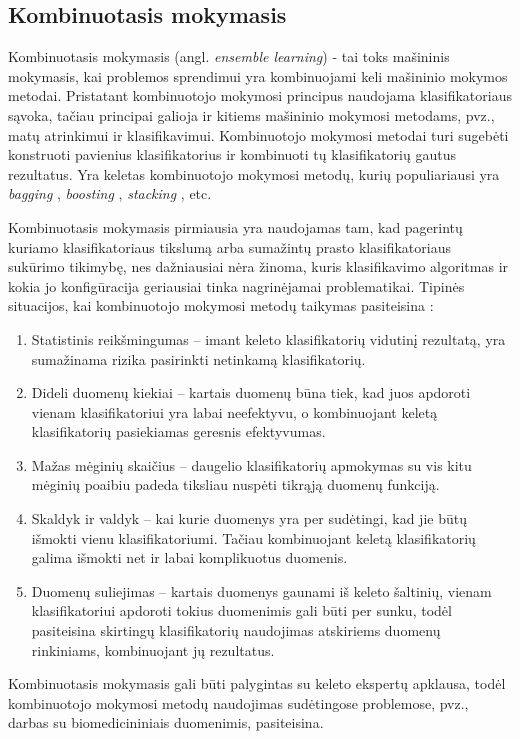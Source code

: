 

\subsection{Kombinuotasis mokymasis}

Kombinuotasis mokymasis (angl. \textit{ensemble learning}) - tai toks mašininis mokymasis, kai problemos sprendimui yra kombinuojami keli mašininio mokymos metodai. Pristatant kombinuotojo mokymosi principus naudojama klasifikatoriaus sąvoka, tačiau principai galioja ir kitiems mašininio mokymosi metodams, pvz., matų atrinkimui ir klasifikavimui. Kombinuotojo mokymosi metodai turi sugebėti konstruoti pavienius klasifikatorius ir kombinuoti tų klasifikatorių gautus rezultatus. Yra keletas kombinuotojo mokymosi metodų, kurių populiariausi yra \textit{bagging} \cite{breiman1996bagging}, \textit{boosting} \cite{schapire2003boosting}, \textit{stacking} \cite{wolpert1992stacked}, etc.

Kombinuotasis mokymasis pirmiausia yra naudojamas tam, kad pagerintų kuriamo klasifikatoriaus tikslumą arba sumažintų prasto klasifikatoriaus sukūrimo tikimybę, nes dažniausiai nėra žinoma, kuris klasifikavimo algoritmas ir kokia jo konfigūracija geriausiai tinka nagrinėjamai problematikai. Tipinės situacijos, kai kombinuotojo mokymosi metodų taikymas pasiteisina \cite{polikar2006ensemble}:
\begin{enumerate}
 \item Statistinis reikšmingumas -- imant keleto klasifikatorių vidutinį rezultatą, yra sumažinama rizika pasirinkti netinkamą klasifikatorių.
 \item Dideli duomenų kiekiai -- kartais duomenų būna tiek, kad juos apdoroti vienam klasifikatoriui yra labai neefektyvu, o kombinuojant keletą klasifikatorių pasiekiamas geresnis efektyvumas.
 \item Mažas mėginių skaičius -- daugelio klasifikatorių apmokymas su vis kitu mėginių poaibiu padeda tiksliau nuspėti tikrąją duomenų funkciją.
 \item Skaldyk ir valdyk -- kai kurie duomenys yra per sudėtingi, kad jie būtų išmokti vienu klasifikatoriumi. Tačiau kombinuojant keletą klasifikatorių galima išmokti net ir labai komplikuotus duomenis. 
 \item Duomenų suliejimas -- kartais duomenys gaunami iš keleto šaltinių, vienam klasifikatoriui apdoroti tokius duomenimis gali būti per sunku, todėl pasiteisina skirtingų klasifikatorių naudojimas atskiriems duomenų rinkiniams, kombinuojant jų rezultatus.
\end{enumerate}
Kombinuotasis mokymasis gali būti palygintas su keleto ekspertų apklausa, todėl kombinuotojo mokymosi metodų naudojimas sudėtingose problemose, pvz., darbas su biomedicininiais duomenimis, pasiteisina.
